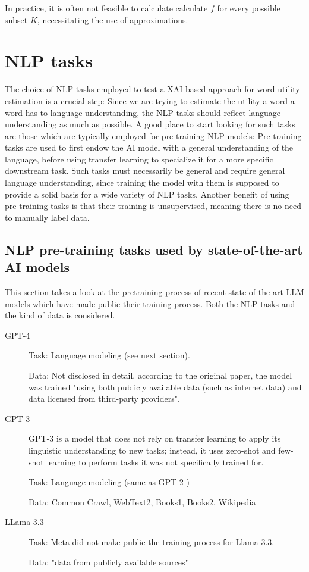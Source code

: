In practice, it is often not feasible to calculate calculate $f$ for every possible subset $K$, necessitating the use of approximations.



\section{NLP tasks}
The choice of NLP tasks employed to test a XAI-based approach for word utility estimation is a crucial step:
Since we are trying to estimate the utility a word a word has to language understanding, the NLP tasks should reflect language understanding as much as possible.
A good place to start looking for such tasks are those which are typically employed for pre-training NLP models:
Pre-training tasks are used to first endow the AI model with a general understanding of the language, before using transfer learning to specialize it for a more specific downstream task.
Such tasks must necessarily be general and require general language understanding, since training the model with them is supposed to provide a solid basis for a wide variety of NLP tasks.
Another benefit of using pre-training tasks is that their training is unsupervised, meaning there is no need to manually label data.

\subsection{NLP pre-training tasks used by state-of-the-art AI models}
This section takes a look at the pretraining process of recent state-of-the-art LLM models which have made public their training process.
Both the NLP tasks and the kind of data is considered.


\begin{description}
	\item[GPT-4] \cite{openaiGPT4TechnicalReport2024}

	      Task: Language modeling (see next section).

	      Data: Not disclosed in detail, according to the original paper, the model was trained "using both publicly available data (such as internet data) and data licensed from third-party providers".
	\item[GPT-3] \cite{brownLanguageModelsAre2020}
	      GPT-3 is a model that does not rely on transfer learning to apply its linguistic understanding to new tasks; instead, it uses zero-shot and few-shot learning to perform tasks it was not specifically trained for.

	      Task: Language modeling (same as GPT-2 \cite{radfordLanguageModelsAre2019})

	      Data: Common Crawl, WebText2, Books1, Books2, Wikipedia 
	\item[LLama 3.3] \cite{LlamamodelsModelsLlama3_3}


	      Task: Meta did not make public the training process for Llama 3.3.

	      Data: "data from publicly available sources"
\end{description}

